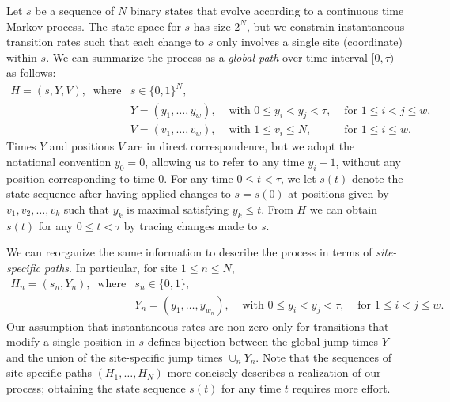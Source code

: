\documentclass[11pt]{article}
\newcommand\halfopen[2]{\ensuremath{[#1,#2)}}
\begin{document}
Let $s$ be a sequence of $N$ binary states that evolve according to a
continuous time Markov process. The state space for $s$ has size
$2^N$, but we constrain instantaneous transition rates such that each
change to $s$ only involves a single site (coordinate) within $s$. We
can summarize the process as a {\it global path} over time interval
$\halfopen{0}{\tau}$ as follows:
\begin{equation}\label{globalJumps}
\begin{array}{llll}
H = (s, Y, V), ~\mbox{ where} & s \in \{0,1\}^N,\\
                              & Y = (y_1, \ldots, y_w), & \mbox{ with } 0 \leq y_i < y_{j} < \tau, & \mbox{ for } 1\leq i < j \leq w,\\
                              & V = (v_1,\ldots, v_w), & \mbox{ with } 1\leq v_i\leq N, & \mbox{ for } 1\leq i \leq w.
\end{array}
\end{equation}
Times $Y$ and positions $V$ are in direct correspondence, but we adopt
the notational convention $y_0 = 0$, allowing us to refer to any time
$y_i-1$, without any position corresponding to time $0$.
For any time $0 \leq t < \tau$, we let $s(t)$ denote the state
sequence after having applied changes to $s = s(0)$ at positions given
by $v_1,v_2,\ldots,v_k$ such that $y_k$ is maximal satisfying $y_k
\leq t$. From $H$ we can obtain $s(t)$ for any $0\leq t < \tau$ by
tracing changes made to $s$.

We can reorganize the same information to describe the process in
terms of {\it site-specific paths}. In particular, for site $1\leq n
\leq N$,
\begin{equation}\label{localJumps}
\begin{array}{llll}
H_n = (s_n, Y_n), ~\mbox{ where} & s_n \in \{0,1\},\\
                                & Y_n = (y_1, \ldots, y_{w_n}), & \mbox{ with } 0\leq y_i < y_{j} < \tau, & \mbox{ for } 1\leq i < j \leq w.
\end{array}
\end{equation}
Our assumption that instantaneous rates are non-zero only for
transitions that modify a single position in $s$ defines bijection
between the global jump times $Y$ and the union of the site-specific
jump times $\cup_n Y_n$. Note that the sequences of site-specific
paths $(H_1,\ldots,H_N)$ more concisely describes a realization of our
process; obtaining the state sequence $s(t)$ for any time $t$ requires
more effort.
\end{document}
